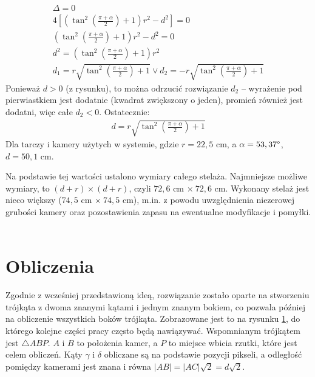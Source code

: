 \begin{gather*}
\Delta = 0 \\
4[(\tan^2(\frac{\pi + \alpha}{2}) + 1)r^2 - d^2] = 0 \\
(\tan^2(\frac{\pi + \alpha}{2}) + 1)r^2 - d^2 = 0 \\
d^2 = (\tan^2(\frac{\pi + \alpha}{2}) + 1)r^2 \\
d_1 = r\sqrt{\tan^2(\frac{\pi + \alpha}{2}) + 1} \lor d_2 = - r\sqrt{\tan^2(\frac{\pi + \alpha}{2}) + 1}
\end{gather*}
Ponieważ $d > 0$ (z rysunku), to można odrzucić rozwiązanie $d_2$ -- wyrażenie pod pierwiastkiem jest dodatnie (kwadrat zwiększony o jeden), promień również jest dodatni, więc całe $d_2 < 0$. Ostatecznie:
\begin{gather*}
d = r\sqrt{\tan^2(\frac{\pi + \alpha}{2}) + 1}
\end{gather*}
Dla tarczy i kamery użytych w systemie, gdzie $r = 22,5$ cm, a $\alpha = 53,37\degree$, $d = 50,1$ cm.

Na podstawie tej wartości ustalono wymiary całego stelaża. Najmniejsze możliwe wymiary, to $(d + r) \times (d + r)$, czyli $72,6$ cm $\times \ 72,6$ cm. Wykonany stelaż jest nieco większy ($74,5$ cm $\times \ 74,5$ cm), m.in. z powodu uwzględnienia niezerowej grubości kamery oraz pozostawienia zapasu na ewentualne modyfikacje i pomyłki.

\begin{gather*}
\end{gather*}

\section{Obliczenia}
Zgodnie z wcześniej przedstawioną ideą, rozwiązanie zostało oparte na stworzeniu trójkąta z dwoma znanymi kątami i jednym znanym bokiem, co pozwala później na obliczenie wszystkich boków trójkąta. Zobrazowane jest to na rysunku \ref{stelaz_trojkat}, do którego kolejne części pracy często będą nawiązywać. Wspomnianym trójkątem jest $\triangle ABP$. $A$ i $B$ to położenia kamer, a $P$ to miejsce wbicia rzutki, które jest celem obliczeń. Kąty $\gamma$ i $\delta$ obliczane są na podstawie pozycji pikseli, a odległość pomiędzy kamerami jest znana i równa $|AB| = |AC|\sqrt{2} = d\sqrt{2}$.

\begin{figure}[h!]
\begin{center}

\end{center}
\label{stelaz_trojkat}
\end{figure} 


